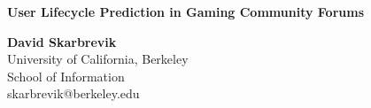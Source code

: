 \documentclass{article}
\begin{document}
\begingroup
	\fontsize{15pt}{15pt}
	\begin{center}
	\textbf{User Lifecycle Prediction in Gaming Community Forums} %
	\end{center}
\endgroup
\vspace{1mm}

\begingroup
	\begin{center}
	\fontsize{12pt}{12pt}
	\textbf{David Skarbrevik} \\
	University of California, Berkeley \\
	School of Information \\
	skarbrevik@berkeley.edu
	\end{center}
\endgroup
\vspace{1mm}
\end{document}
